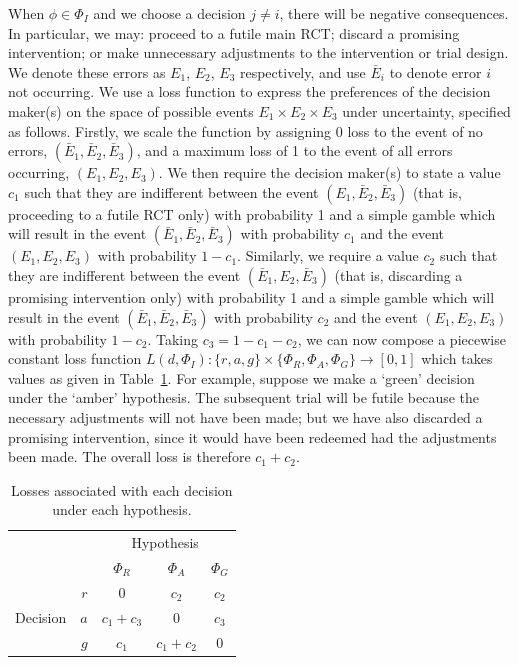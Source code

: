 \documentclass{article} %
\begin{document}
When $\phi \in \Phi_{I}$ and we choose a decision $j \neq i$, there will be negative consequences. In particular, we may: proceed to a futile main RCT; discard a promising intervention; or make unnecessary adjustments to the intervention or trial design. We denote these errors as $E_1$, $E_2$, $E_3$ respectively, and use $\bar{E}_i$ to denote error $i$ not occurring. We use a loss function to express the preferences of the decision maker(s) on the space of possible events $E_1 \times E_2 \times E_3$ under uncertainty, specified as follows. Firstly, we scale the function by assigning 0 loss to the event of no errors, $(\bar{E}_1, \bar{E}_2, \bar{E}_3)$, and a maximum loss of 1 to the event of all errors occurring, $(E_1, E_2, E_3)$. We then require the decision maker(s) to state a value $c_1$ such that they are indifferent between the event $(E_1, \bar{E}_2, \bar{E}_3)$ (that is, proceeding to a futile RCT only) with probability 1 and a simple gamble which will result in the event $(\bar{E}_1, \bar{E}_2, \bar{E}_3)$ with probability $c_1$ and the event $(E_1, E_2, E_3)$ with probability $1-c_1$. Similarly, we require a value $c_2$ such that they are indifferent between the event $(\bar{E}_1, E_2, \bar{E}_3)$ (that is, discarding a promising intervention only) with probability 1 and a simple gamble which will result in the event $(\bar{E}_1, \bar{E}_2, \bar{E}_3)$ with probability $c_2$ and the event $(E_1, E_2, E_3)$ with probability $1-c_2$. Taking $c_3 = 1 - c_1 - c_2$, we can now compose a piecewise constant loss function  $L(d, \Phi_{I}): \{r, a, g\} \times \{\Phi_{R}, \Phi_{A}, \Phi_{G}\} \rightarrow [0,1]$ which takes values as given in Table~\ref{tab:loss}. For example, suppose we make a `green' decision under the `amber' hypothesis. The subsequent trial will be futile because the necessary adjustments will not have been made; but we have also discarded a promising intervention, since it would have been redeemed had the adjustments been made. The overall loss is therefore $c_{1} + c_{2}$.

\begin{table}
\caption{Losses associated with each decision under each hypothesis.}
\centering
\begin{tabular}{r r c c c}
\toprule
& & \multicolumn{3}{c}{Hypothesis} \\
& & $\Phi_{R}$ & $\Phi_{A}$ & $\Phi_{G}$ \\
\midrule
\multirow{3}{*}{Decision} & $r$ & 0 & $c_{2}$ & $c_{2}$ \\
 & $a$ & $c_{1} + c_{3}$ & 0 & $c_{3}$ \\
 & $g$ & $c_{1}$ & $c_{1} + c_{2}$ & 0  \\
\bottomrule
\end{tabular}
\label{tab:loss}
\end{table}
\end{document}
